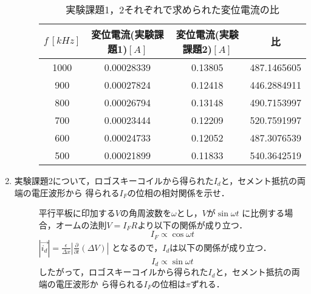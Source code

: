 \begin{enumerate}
\begin{description}
        
        \begin{table}[H]
            \centering
            \caption{実験課題1，2それぞれで求められた変位電流の比}
            \begin{tabular}{c|cc|c}
                \hline
                $f\,[\si{kHz}]$ & 変位電流(実験課題1)$[\si{A}]$ & 変位電流(実験課題2)$[\si{A}]$ & 比 \\ \hline
                1000 & 0.00028339 & 0.13805 & 487.1465605 \\ 
                900 & 0.00027824 & 0.12418 & 446.2884911 \\ 
                800 & 0.00026794 & 0.13148 & 490.7153997 \\ 
                700 & 0.00023444 & 0.12209 & 520.7591997 \\ 
                600 & 0.00024733 & 0.12052 & 487.3076539 \\ 
                500 & 0.00021899 & 0.11833 & 540.3642519 \\ \hline
            \end{tabular}
        \end{table}
    \end{description}
    
\newpage

    \item 実験課題2について，ロゴスキーコイルから得られた$I_d$と，セメント抵抗の両端の電圧波形から
    得られる$I_F$の位相の相対関係を示せ．
    \begin{description}
        \item[] 平行平板に印加する$V$の角周波数を$\omega$とし，$V$が$\sin \omega t$
        に比例する場合，オームの法則$V=I_F R$より以下の関係が成り立つ．
        $$
        I_F\propto\cos\omega t
        $$
        $|\vec{i_d}|=\frac{\epsilon}{\Delta x}|\frac{\partial}{\partial t}(\Delta V)|$
        となるので，$I_d$は以下の関係が成り立つ．
        $$
        I_d\propto\sin \omega t
        $$
        したがって，ロゴスキーコイルから得られた$I_d$と，セメント抵抗の両端の電圧波形か
        ら得られる$I_F$の位相は$\pi$ずれる．

    \end{description}


\end{enumerate}

